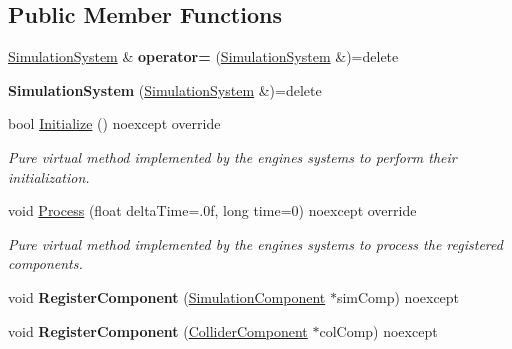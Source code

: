 \subsection*{Public Member Functions}
\begin{DoxyCompactItemize}
\item 
\mbox{\label{class_blade_1_1_simulation_system_a47e9db83aee131450f028cea185a0353}} 
\hyperlink{class_blade_1_1_simulation_system}{Simulation\+System} \& {\bfseries operator=} (\hyperlink{class_blade_1_1_simulation_system}{Simulation\+System} \&)=delete
\item 
\mbox{\label{class_blade_1_1_simulation_system_ad190fdcf46746653d25eba680ff67521}} 
{\bfseries Simulation\+System} (\hyperlink{class_blade_1_1_simulation_system}{Simulation\+System} \&)=delete
\item 
bool \hyperlink{class_blade_1_1_simulation_system_a44ca3c7941497162d70f1e9e53b016f9}{Initialize} () noexcept override
\begin{DoxyCompactList}\small\item\em Pure virtual method implemented by the engine\textquotesingle{}s systems to perform their initialization. \end{DoxyCompactList}\item 
void \hyperlink{class_blade_1_1_simulation_system_ade81487a31325272e8489c772530ccf5}{Process} (float delta\+Time=.\+0f, long time=0) noexcept override
\begin{DoxyCompactList}\small\item\em Pure virtual method implemented by the engine\textquotesingle{}s systems to process the registered components. \end{DoxyCompactList}\item 
\mbox{\label{class_blade_1_1_simulation_system_a638c4b8971944ab94cfda2c59a651665}} 
void {\bfseries Register\+Component} (\hyperlink{class_blade_1_1_simulation_component}{Simulation\+Component} $\ast$sim\+Comp) noexcept
\item 
\mbox{\label{class_blade_1_1_simulation_system_ad1a98c60a727feba8899e57cacfbab70}} 
void {\bfseries Register\+Component} (\hyperlink{class_blade_1_1_collider_component}{Collider\+Component} $\ast$col\+Comp) noexcept
\item 

\end{DoxyCompactItemize}
